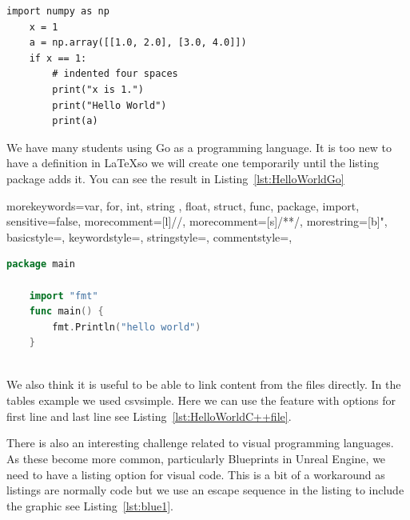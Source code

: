 \lstset{language=Python}
\begin{lstlisting}[caption = {The code listing for a Python increment a matrix example}, label={lst:Python}]
    import numpy as np
    x = 1
    a = np.array([[1.0, 2.0], [3.0, 4.0]])
    if x == 1:
        # indented four spaces
        print("x is 1.")
        print("Hello World")
        print(a)
\end{lstlisting}


We have many students using Go as a programming language.  It is too new to have a definition in \LaTeX so we will create one temporarily until the listing package adds it. You can see the result in Listing~\ref{lst:HelloWorldGo}

    {   morekeywords={var, for, int, string , float, struct, func, package, import},
        sensitive=false,
        morecomment=[l]{//},
        morecomment=[s]{/*}{*/},
        morestring=[b]",
        basicstyle=\ttfamily,
        keywordstyle=\color{red}\ttfamily,
        stringstyle=\color{darkgreen}\ttfamily,
        commentstyle=\color{blue}\ttfamily,
    }

\begin{lstlisting}[language=go, caption={Go code for hello world}, label={lst:HelloWorldGo}]
    package main

    import "fmt"
    func main() {
        fmt.Println("hello world")
    }
    
\end{lstlisting}




We also think it is useful to be able to link content from the files directly.  In the tables example we used csvsimple.  Here we can use the feature \lstinline{} with options for first line and last line see Listing~\ref{lst:HelloWorldC++file}.



There is also an interesting challenge related to visual programming languages.  As these become more common, particularly Blueprints in Unreal Engine, we need to have a listing option for visual code.  This is a bit of a workaround as listings are normally code but we use an escape sequence in the listing to include the graphic see Listing~\ref{lst:blue1}.


